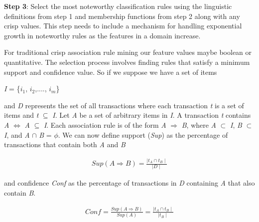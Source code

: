 

\noindent
\textbf{Step 3}: Select the most noteworthy classification rules using the linguistic definitions from step 1 and membership functions from step 2 along with any crisp values. This step needs to include a mechanism for handling exponential growth in noteworthy rules as the features in a domain increase.

For traditional crisp association rule mining our feature values maybe boolean or quantitative. The selection process involves finding rules that satisfy a minimum support and confidence value. So if we suppose we have a set of items

\textit{I} = \{$i_1$, $i_2$,...., $i_m$\}

\noindent
and \textit{D} represents the set of all transactions where each transaction \textit{t} is a set of items and \textit{t} $\subseteq$ \textit{I}.
Let \textit{A} be a set of arbitrary items in \textit{I}. A transaction \textit{t} contains \textit{A} $\iff$ \textit{A} $\subseteq$ \textit{I}. Each association rule is of the form \textit{A} $\Rightarrow$ \textit{B}, where \textit{A} $\subset$ \textit{I}, \textit{B} $\subset$ \textit{I}, and \textit{A} $\cap$ \textit{B} = $\phi$.
We can now define support (\textit{Sup}) as the percentage of transactions that contain both \textit{A} and \textit{B}


\begin{align}
    \textit{Sup}(\textit{A} \Rightarrow \textit{B}) = \frac{\mid \textit{t}_A \cap \textit{t}_B \mid}{\mid \textit{D} \mid}
\end{align}


\noindent
and confidence \textit{Conf} as the percentage of transactions in \textit{D} containing \textit{A} that also contain \textit{B}.

\begin{align}
    \textit{Conf} = \frac{\textit{Sup}(\textit{A} \Rightarrow \textit{B})}{\textit{Sup}(\textit{A})} = \frac{\mid \textit{t}_A \cap \textit{t}_B \mid}{\mid \textit{t}_B \mid}
\end{align}


